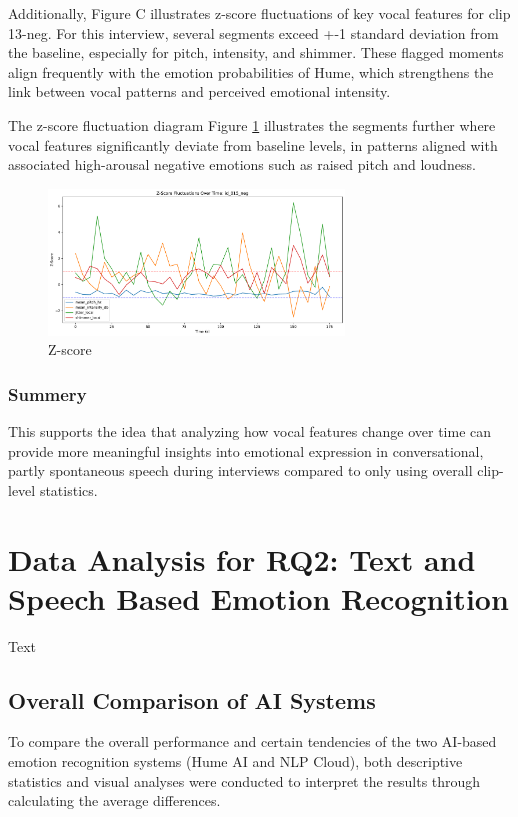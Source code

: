 Additionally, Figure C illustrates z-score fluctuations of key vocal features for clip 13-neg. For this interview, several segments exceed +-1 standard deviation from the baseline, especially for pitch, intensity, and shimmer. These flagged moments align frequently with the emotion probabilities of Hume, which strengthens the link between vocal patterns and perceived emotional intensity. 

The z-score fluctuation diagram Figure \ref{fig:z-score-15} illustrates the segments further where vocal features significantly deviate from baseline levels, in patterns aligned with associated high-arousal negative emotions such as raised pitch and loudness. 

\begin{figure}[H]
    \centering 
    \includegraphics[width=0.7\textwidth]{png/results/rq1/zscore_fluctuations_id_015_neg.pdf}
    \caption{Z-score}
    \label{fig:z-score-15}
\end{figure}

\subsubsection{Summery}
This supports the idea that analyzing how vocal features change over time  can provide more meaningful insights into emotional expression in conversational, partly spontaneous speech during interviews compared to only using overall clip-level statistics.


\section{Data Analysis for RQ2: Text and Speech Based Emotion Recognition}
Text 
\subsection{Overall Comparison of AI Systems}
To compare the overall performance and certain tendencies of the two AI-based emotion recognition systems (Hume AI and NLP Cloud),
both descriptive statistics and visual analyses were conducted to interpret the results through calculating the average differences.


